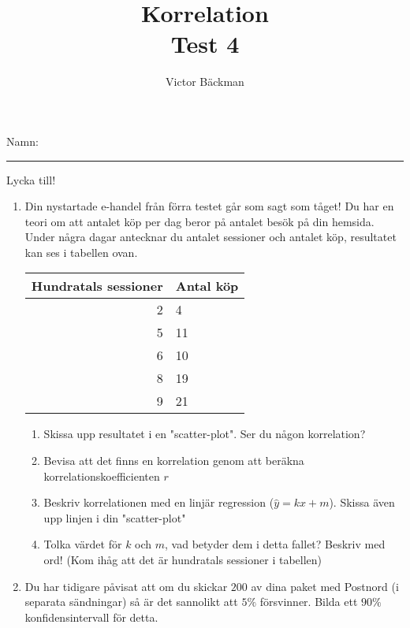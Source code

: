 \documentclass[a4paper,10pt]{article}
\title{Korrelation \\ {\large Test 4}}
\author{Victor Bäckman}
\begin{document}
\maketitle
\vspace{2cm}
Namn:
{\rule{13cm}{0.4pt}}
\vspace{8cm}
\begin{center}
  {\huge Lycka till!}
\end{center}
\newpage
\begin{enumerate}
    \item{Din nystartade e-handel från förra testet går som sagt som tåget! Du har en teori om att antalet köp per dag beror på antalet besök på din hemsida. Under några dagar antecknar du antalet sessioner och antalet köp, resultatet kan ses i tabellen ovan.
      \begin{table}
        \centering
        \begin{tabular}[H]{r|l}
        \textbf{Hundratals sessioner} & \textbf{Antal köp} \\ \hline
        2                            & 4                  \\
        5                            & 11                  \\
        6                            & 10                 \\
        8                            & 19                 \\
        9                            & 21
        \end{tabular}
    \end{table}
   }
    \begin{enumerate}
        \item{Skissa upp resultatet i en "scatter-plot". Ser du någon korrelation?}
        \newpage
        \item{Bevisa att det finns en korrelation genom att beräkna korrelationskoefficienten $r$}
        \newpage
        \item{Beskriv korrelationen med en linjär regression ($\hat{y}=kx+m$). Skissa även upp linjen i din "scatter-plot"}
        \newpage
      \item{Tolka värdet för $k$ och $m$, vad betyder dem i detta fallet? Beskriv med ord! (Kom ihåg att det är hundratals sessioner i tabellen)}
    \end{enumerate}
  \newpage
  \item{Du har tidigare påvisat att om du skickar $200$ av dina paket med Postnord (i separata sändningar) så är det sannolikt att $5\%$ försvinner. Bilda ett $90\%$ konfidensintervall för detta.}
\end{enumerate}
\end{document}
